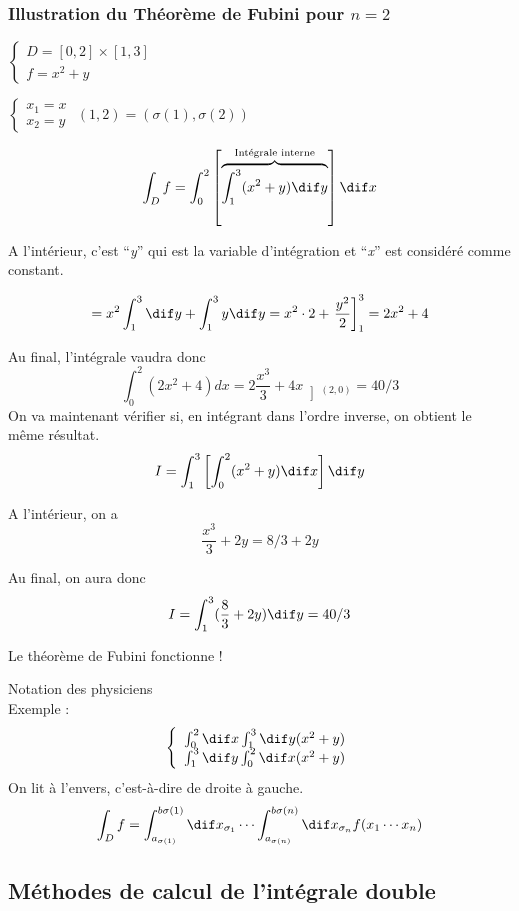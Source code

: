 \subsubsection{Illustration du Théorème de Fubini pour $n=2$}




$ \left\{
\begin{array}{l}
D = [0,2]\times[1,3]\\
f = x^2+y
\end{array}
\right.
$

$
 \left\{
\begin{array}{l}
x_1=x\\
x_2=y
\end{array}
\right.
$
$(1,2)=(\sigma(1),\sigma(2))$

\[\int_D f = \int_0^2 \left[ \overbrace{\int_1^3 (x^2+y) \dif y}^{\text{Intégrale interne}}\right] \dif x\]

A l'intérieur, c'est ``\textit{y}'' qui est la variable d'intégration et ``\textit{x}'' est considéré comme constant.

\[=x^2\int_1^3 \dif y+\int _1^3 y \dif y = x^2 \cdot 2+\left.\frac{y^2}{2}\right]_1^3 = 2x^2+4\]

Au final, l'intégrale vaudra donc
\[  \int_0^2(2x^2+4)dx = 2\frac{x^3}{3}+4x \left]_{(2,0)} \right.= 40/3\]
On va maintenant vérifier si, en intégrant dans l'ordre inverse, on obtient le même résultat.
\[I = \int_1^3 \left[ \int_0^2 (x^2+y)\dif x \right] \dif y\]

A l'intérieur, on a \[\frac{x^3}{3}+2y = 8/3 + 2y\]

Au final, on aura donc \[I = \int_1^3(\frac{8}{3}+2y)\dif y = 40/3\]

Le théorème de Fubini fonctionne !

\begin{myrem}
Notation des physiciens\\
Exemple :
$$\left\{
\begin{array}{l}
\int_0^2\dif x\int_1^3\dif y (x^2+y)\\
\int_1^3\dif y\int_0^2 \dif x ( x^2+y)
\end{array}
\right.
$$
On lit à l'envers, c'est-à-dire de droite à gauche.
\[\int_D f = \int_{a_{\sigma(1)}}^{b{\sigma(1)}} \dif x_{\sigma_1} \cdots \int_{a_{\sigma(n)}}^{b{\sigma(n)}} \dif x_{\sigma_n} f(x_1 \cdots x_n)\]

\end{myrem}

\subsection{Méthodes de calcul de l'intégrale double}
